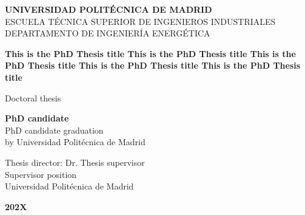 \begin{center}
\begin{spacing}{1.3}
\textbf{\Large UNIVERSIDAD POLITÉCNICA DE MADRID}\\
{\large ESCUELA TÉCNICA SUPERIOR DE INGENIEROS INDUSTRIALES}\\
{\large DEPARTAMENTO DE INGENIERÍA ENERGÉTICA}\\
\end{spacing}
\end{center}

\vspace{23mm}

\begin{center}
\begin{spacing}{1.6}
\textbf{\LARGE This is the PhD Thesis title This is the PhD Thesis title This is the PhD Thesis title This is the PhD Thesis title This is the PhD Thesis title}
\end{spacing}
\end{center}

\vspace{10 mm}

\begin{center}
{\Large Doctoral thesis}
\end{center}

\vspace{10 mm}

\begin{center}
\begin{spacing}{1.7}
\textbf{\Large PhD candidate}\\
{\large PhD candidate graduation}\\
{\large by Universidad Politécnica de Madrid}\\
\end{spacing}
\end{center}

\vspace{15 mm}

\begin{center}
\begin{spacing}{1.5}
    {\Large Thesis director: Dr. Thesis supervisor}\\
    {\large Supervisor position}\\
    {\large Universidad Politécnica de Madrid}\\
\end{spacing}
\end{center}

\vspace{10 mm}

\begin{center}
    \textbf{\Large 202X}
\end{center}